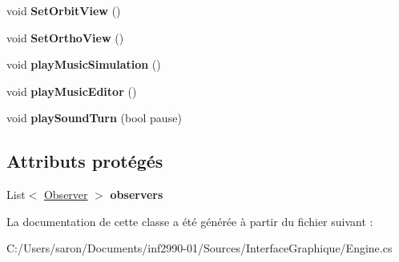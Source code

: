 \begin{DoxyCompactItemize}
\item 
\hypertarget{class_interface_graphique_1_1_engine_a7a91548a68f650a1e4ed68c3197ac10e}{void {\bfseries Set\-Orbit\-View} ()}\label{class_interface_graphique_1_1_engine_a7a91548a68f650a1e4ed68c3197ac10e}

\item 
\hypertarget{class_interface_graphique_1_1_engine_a9ee23d33fc22d9b3aa1ec9bf7e0aa7ab}{void {\bfseries Set\-Ortho\-View} ()}\label{class_interface_graphique_1_1_engine_a9ee23d33fc22d9b3aa1ec9bf7e0aa7ab}

\item 
\hypertarget{class_interface_graphique_1_1_engine_a32d4bf7959ef0ce9d7e8ed9fbc66510c}{void {\bfseries play\-Music\-Simulation} ()}\label{class_interface_graphique_1_1_engine_a32d4bf7959ef0ce9d7e8ed9fbc66510c}

\item 
\hypertarget{class_interface_graphique_1_1_engine_a67bc345939c3c36c5e936ba81948c5d6}{void {\bfseries play\-Music\-Editor} ()}\label{class_interface_graphique_1_1_engine_a67bc345939c3c36c5e936ba81948c5d6}

\item 
\hypertarget{class_interface_graphique_1_1_engine_ae61280e1b0dab37925166b8a623c999f}{void {\bfseries play\-Sound\-Turn} (bool pause)}\label{class_interface_graphique_1_1_engine_ae61280e1b0dab37925166b8a623c999f}

\end{DoxyCompactItemize}
\subsection*{Attributs protégés}
\begin{DoxyCompactItemize}
\item 
\hypertarget{class_interface_graphique_1_1_engine_a637816e50122a2ce73b5b16e0cc6909f}{List$<$ \hyperlink{interface_interface_graphique_1_1_observer}{Observer} $>$ {\bfseries observers}}\label{class_interface_graphique_1_1_engine_a637816e50122a2ce73b5b16e0cc6909f}

\end{DoxyCompactItemize}


La documentation de cette classe a été générée à partir du fichier suivant \-:\begin{DoxyCompactItemize}
\item 
C\-:/\-Users/saron/\-Documents/inf2990-\/01/\-Sources/\-Interface\-Graphique/Engine.\-cs\end{DoxyCompactItemize}
